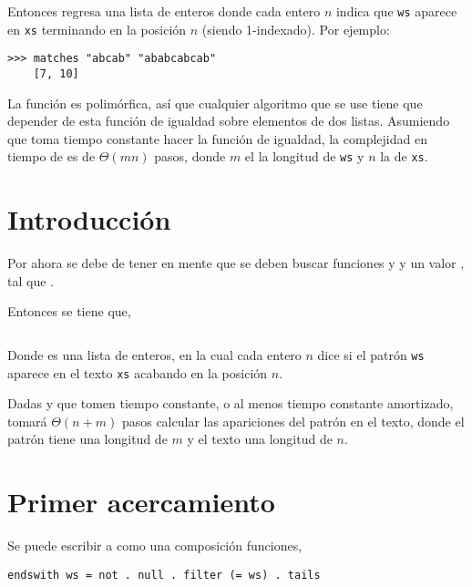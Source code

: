 Entonces  regresa una lista de enteros donde cada entero $n$ indica que
\texttt{ws} aparece en \texttt{xs} terminando en la posición $n$ (siendo 1-indexado). Por ejemplo:

\begin{verbatim}
>>> matches "abcab" "ababcabcab"
    [7, 10]
\end{verbatim}

La función  es polimórfica, así que cualquier algoritmo que se use tiene que
depender de esta función de igualdad  sobre elementos de dos listas.
Asumiendo que toma tiempo constante hacer la función de igualdad, la complejidad en tiempo de
 es de $\Theta(mn)$ pasos, donde $m$ el la longitud de \texttt{ws} y $n$ la
de \texttt{xs}.

\section{Introducción}

Por ahora se debe de tener en mente que se deben buscar funciones  y  y un
valor , tal que .

Entonces se tiene que,

\inputminted{haskell}{definiciones/kmp/1-matches.hs}

Donde  es una lista de enteros, en la cual cada entero $n$ dice si el patrón
\texttt{ws} aparece en el texto \texttt{xs} acabando en la posición $n$.

Dadas  y  que tomen tiempo constante, o al menos tiempo constante amortizado,
 tomará $\Theta(n + m)$ pasos calcular las apariciones del patrón en el texto, donde
el patrón tiene una longitud de $m$ y el texto una longitud de $n$.

\section{Primer acercamiento}

Se puede escribir a  como una composición funciones,
\begin{verbatim}
endswith ws = not . null . filter (= ws) . tails
\end{verbatim}

